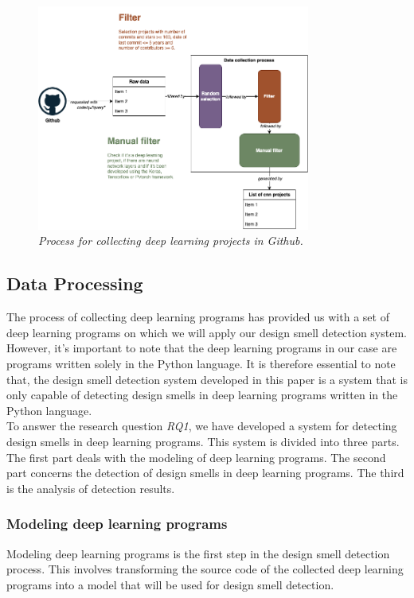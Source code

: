 \begin{figure}[h]
  \centering
  \includegraphics[width=0.8\textwidth]{figure/design_smell_data_collection.png}
  \caption{\emph{Process for collecting deep learning projects in Github.}}
  \label{fig:data_collect}
\end{figure}






\subsection{Data Processing}
\label{sec:DataProcessing}
The process of collecting deep learning programs has provided us with a set of deep learning programs on which we will apply our design smell detection system. However, it's important to note that the deep learning programs in our case are programs written solely in the Python language. It is therefore essential to note that, the design smell detection system developed in this paper is a system that is only capable of detecting design smells in deep learning programs written in the Python language.\\

To answer the research question \emph{RQ1}, we have developed a system for detecting design smells in deep learning programs. This system is divided into three parts. The first part deals with the modeling of deep learning programs. The second part concerns the detection of design smells in deep learning programs. The third is the analysis of detection results.\\

\subsubsection{Modeling deep learning programs}
\label{sec:modelingDeepLearningPrograms}
Modeling deep learning programs is the first step in the design smell detection
process. This involves transforming the source code of the collected deep
learning programs into a model that will be used for design smell detection.

